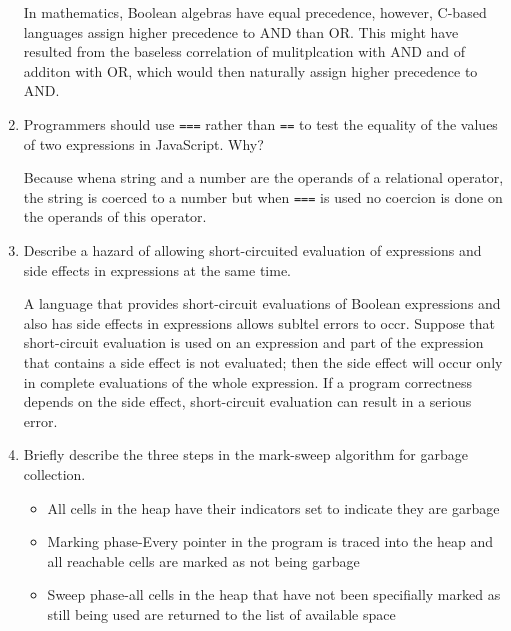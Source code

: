 \begin{enumerate}
  \begin{answer}

    In mathematics, Boolean algebras have equal precedence, however, C-based languages assign higher precedence to AND than OR. This might have resulted from the baseless correlation of mulitplcation with AND and of additon with OR, which would then naturally assign higher precedence to AND.

    \end{answer}

  \item Programmers should use \verb+===+ rather than \verb+==+ to
    test the equality of the values of two expressions in JavaScript. Why?

  \begin{answer}

    Because whena  string and a number are the operands of a relational operator, the string is coerced to a number but when \verb+===+ is used no coercion is done on the operands of this operator.

    \end{answer}

  \item Describe a hazard of allowing short-circuited evaluation
    of expressions and side effects in expressions at the same time.

  \begin{answer}

    A language that provides short-circuit evaluations of Boolean expressions and also has side effects in expressions allows subltel errors to occr. Suppose that short-circuit evaluation is used on an expression and part of the expression that contains a side effect is not evaluated; then the side effect will occur only in complete evaluations of the whole expression. If a program correctness depends on the side effect, short-circuit evaluation can result in a serious error.

    \end{answer}

  \item Briefly describe the three steps in the mark-sweep algorithm
    for garbage collection.

  \begin{answer}

    \begin{itemize}
      \item{All cells in the heap have their indicators set to indicate they are garbage}
      \item{Marking phase-Every pointer in the program is traced into the heap and all reachable cells are marked as not being garbage}
      \item{Sweep phase-all cells in the heap that have not been specifially marked as still being used are returned to the list of available space}
    \end{itemize}


\end{answer}
\end{enumerate}
